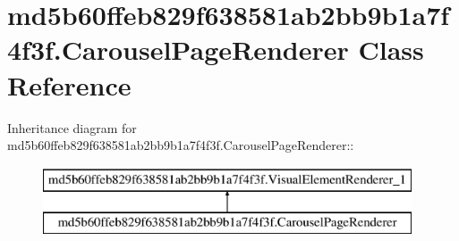 \hypertarget{classmd5b60ffeb829f638581ab2bb9b1a7f4f3f_1_1_carousel_page_renderer}{
\section{md5b60ffeb829f638581ab2bb9b1a7f4f3f.CarouselPageRenderer Class Reference}
\label{classmd5b60ffeb829f638581ab2bb9b1a7f4f3f_1_1_carousel_page_renderer}
}
Inheritance diagram for md5b60ffeb829f638581ab2bb9b1a7f4f3f.CarouselPageRenderer::\begin{figure}[H]
\begin{center}
\leavevmode
\includegraphics[height=2cm]{classmd5b60ffeb829f638581ab2bb9b1a7f4f3f_1_1_carousel_page_renderer}
\end{center}
\end{figure}
